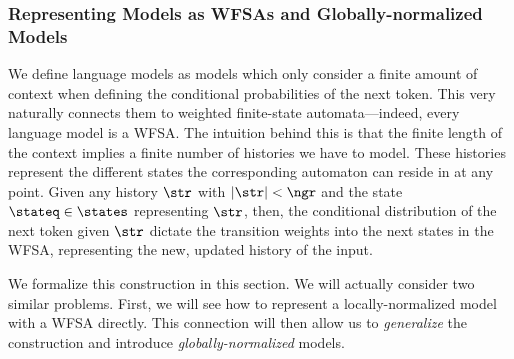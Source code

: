 \subsubsection{Representing \ngram{} Models as WFSAs and Globally-normalized \ngram{} Models} \label{sed:ngram-wfsa}

We define \ngram{} language models as models which only consider a finite amount of context when defining the conditional probabilities of the next token.
This very naturally connects them to weighted finite-state automata---indeed, every \ngram{} language model is a WFSA.
The intuition behind this is that the finite length of the context implies a finite number of histories we have to model.
These histories represent the different states the corresponding automaton can reside in at any point.
Given any history $\str$ with $|\str| < \ngr$ and the state $\stateq \in \states$ representing $\str$, then, the conditional distribution of the next token given $\str$ dictate the transition weights into the next states in the WFSA, representing the new, updated history of the input.

We formalize this construction in this section.
We will actually consider two similar problems.
First, we will see how to represent a locally-normalized \ngram{} model with a WFSA directly.
This connection will then allow us to \emph{generalize} the construction and introduce \emph{globally-normalized} \ngram{} models.

